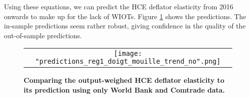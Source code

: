 \documentclass[12pt,a4paper]{paper}
\begin{document}
Using these equations, we can predict the HCE deflator elasticity from 2016 onwards to make up for the lack of WIOTs.
Figure \ref{fig:panel_pred3} shows the predictions. The in-sample predictions seem rather robust, giving confidence in the quality of the out-of-sample predictions.


\begin{figure}[H]
	\centering
	\caption{\footnotesize{\textbf{Comparing the output-weighed HCE deflator elasticity to its prediction using only World Bank and Comtrade data.}}}
	\begin{tabular}{c}
		\texttt{[image: "predictions\_reg1\_doigt\_mouille\_trend\_no".png]}\\
	\end{tabular}
	\label{fig:panel_pred3}
\end{figure}
\end{document}

